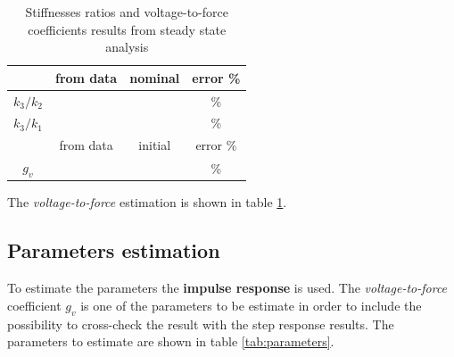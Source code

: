 \documentclass[twosided,a4paper]{article}           %
\begin{document}
\begin{table}[H]
	\centering
	\begin{tabular}{|c|c|c|c|}
		\hline 
		 & from data & nominal & error \% \\ 
		\hline 
		$k_3/k_2$ & &  & \%  \\ 
		\hline 
		$k_3/k_1$ & &  & \% \\
		\hline \hline
		      & from data              & initial & error 
		      \%\\
		\hline
		$g_v$ &  &  & \% \\\hline
	\end{tabular} 
	\label{tab:ratios}
	\caption{Stiffnesses ratios and voltage-to-force coefficients results from steady state analysis}
\end{table}
The \textit{voltage-to-force} estimation is shown in table \ref{tab:ratios}.
\newpage
\subsection{Parameters estimation}
To estimate the parameters the \textbf{impulse response} is used. The \textit{voltage-to-force} coefficient $g_v$ is one of the parameters to be estimate in order to include the possibility to cross-check the result with the step response results.
The parameters to estimate are shown in table \ref{tab:parameters}.
\end{document}
